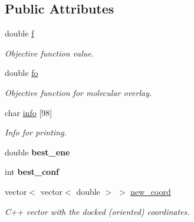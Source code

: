\subsection*{Public Attributes}
\begin{DoxyCompactItemize}
\item 
\hypertarget{classDocker_afa671217e2a11a355fd0415621ac614b}{
double \hyperlink{classDocker_afa671217e2a11a355fd0415621ac614b}{f}}
\label{classDocker_afa671217e2a11a355fd0415621ac614b}

\begin{DoxyCompactList}\small\item\em Objective function value. \item\end{DoxyCompactList}\item 
\hypertarget{classDocker_ada93d7dbf2bd60cbf782cb9b2893d7a0}{
double \hyperlink{classDocker_ada93d7dbf2bd60cbf782cb9b2893d7a0}{fo}}
\label{classDocker_ada93d7dbf2bd60cbf782cb9b2893d7a0}

\begin{DoxyCompactList}\small\item\em Objective function for molecular overlay. \item\end{DoxyCompactList}\item 
\hypertarget{classDocker_a9c6e40784773594309021ff03e2fc822}{
char \hyperlink{classDocker_a9c6e40784773594309021ff03e2fc822}{info} \mbox{[}98\mbox{]}}
\label{classDocker_a9c6e40784773594309021ff03e2fc822}

\begin{DoxyCompactList}\small\item\em Info for printing. \item\end{DoxyCompactList}\item 
\hypertarget{classDocker_a802a6f5b11a70f9d36bc021d6503cd25}{
double {\bfseries best\_\-ene}}
\label{classDocker_a802a6f5b11a70f9d36bc021d6503cd25}

\item 
\hypertarget{classDocker_aa78ed40985a8bb8d93e4628e19280f8c}{
int {\bfseries best\_\-conf}}
\label{classDocker_aa78ed40985a8bb8d93e4628e19280f8c}

\item 
\hypertarget{classDocker_a5516152319142a5411257775ca81763b}{
vector$<$ vector$<$ double $>$ $>$ \hyperlink{classDocker_a5516152319142a5411257775ca81763b}{new\_\-coord}}
\label{classDocker_a5516152319142a5411257775ca81763b}

\begin{DoxyCompactList}\small\item\em C++ vector with the docked (oriented) coordinates. \item\end{DoxyCompactList}\end{DoxyCompactItemize}


